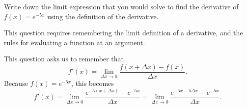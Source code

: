 \documentclass{ximera}
\author{Emma Smith Zbarsky}
\begin{document}
\begin{exercise}

Write down the limit expression that you would solve to find the
derivative of $f(x) = e^{-5x}$ using the definition of the derivative.


\begin{hint}
This question requires remembering the limit definition of a derivative,
and the rules for evaluating a function at an argument.
\end{hint}


\begin{hint}
This question asks us to remember that
\[f'(x) = \lim_{\Delta x \to 0} \frac{f(x+\Delta x)-f(x)}{\Delta x}.\]
Because $f(x) = e^{-5x}$, this becomes
\[f'(x) = \lim_{\Delta x \to 0} \frac{e^{-5(x+\Delta x)}-e^{-5x}}{\Delta x} = \lim_{\Delta x \to 0} \frac{e^{-5x-5\Delta x}-e^{-5x}}{\Delta x}.\]
\end{hint}


\begin{multipleChoice}
\end{multipleChoice}

\end{exercise}
\end{document}
